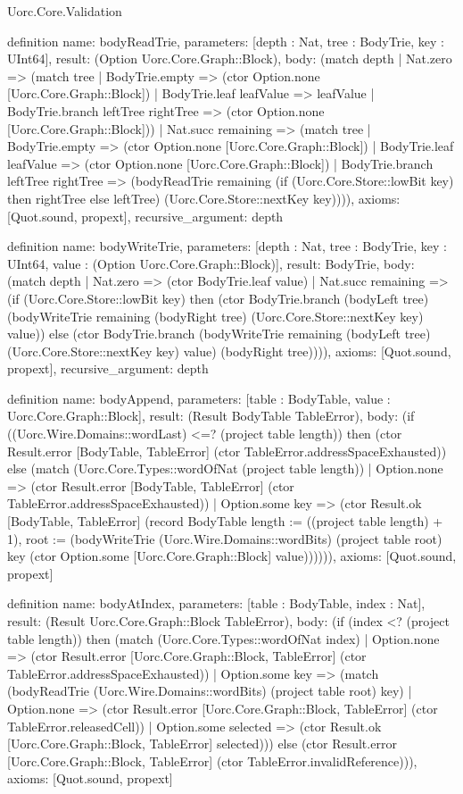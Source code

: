 \begin{lexlean}{Uorc.Core.Validation}
\begin{semanticmodule}
definition{
  name: bodyReadTrie,
  parameters: [depth : Nat, tree : BodyTrie, key : UInt64],
  result: (Option Uorc.Core.Graph::Block),
  body: (match depth
    | Nat.zero => (match tree
      | BodyTrie.empty => (ctor Option.none [Uorc.Core.Graph::Block])
      | BodyTrie.leaf leafValue => leafValue
      | BodyTrie.branch leftTree rightTree => (ctor Option.none [Uorc.Core.Graph::Block]))
    | Nat.succ remaining => (match tree
      | BodyTrie.empty => (ctor Option.none [Uorc.Core.Graph::Block])
      | BodyTrie.leaf leafValue => (ctor Option.none [Uorc.Core.Graph::Block])
      | BodyTrie.branch leftTree rightTree => (bodyReadTrie remaining (if (Uorc.Core.Store::lowBit key) then rightTree else leftTree) (Uorc.Core.Store::nextKey key)))),
  axioms: [Quot.sound, propext],
  recursive_argument: depth
}

definition{
  name: bodyWriteTrie,
  parameters: [depth : Nat, tree : BodyTrie, key : UInt64, value : (Option Uorc.Core.Graph::Block)],
  result: BodyTrie,
  body: (match depth
    | Nat.zero => (ctor BodyTrie.leaf value)
    | Nat.succ remaining => (if (Uorc.Core.Store::lowBit key) then (ctor BodyTrie.branch (bodyLeft tree) (bodyWriteTrie remaining (bodyRight tree) (Uorc.Core.Store::nextKey key) value)) else (ctor BodyTrie.branch (bodyWriteTrie remaining (bodyLeft tree) (Uorc.Core.Store::nextKey key) value) (bodyRight tree)))),
  axioms: [Quot.sound, propext],
  recursive_argument: depth
}

definition{
  name: bodyAppend,
  parameters: [table : BodyTable, value : Uorc.Core.Graph::Block],
  result: (Result BodyTable TableError),
  body: (if ((Uorc.Wire.Domains::wordLast) <=? (project table length)) then (ctor Result.error [BodyTable, TableError] (ctor TableError.addressSpaceExhausted)) else (match (Uorc.Core.Types::wordOfNat (project table length))
    | Option.none => (ctor Result.error [BodyTable, TableError] (ctor TableError.addressSpaceExhausted))
    | Option.some key => (ctor Result.ok [BodyTable, TableError] (record BodyTable {length := ((project table length) + 1), root := (bodyWriteTrie (Uorc.Wire.Domains::wordBits) (project table root) key (ctor Option.some [Uorc.Core.Graph::Block] value))})))),
  axioms: [Quot.sound, propext]
}

definition{
  name: bodyAtIndex,
  parameters: [table : BodyTable, index : Nat],
  result: (Result Uorc.Core.Graph::Block TableError),
  body: (if (index <? (project table length)) then (match (Uorc.Core.Types::wordOfNat index)
    | Option.none => (ctor Result.error [Uorc.Core.Graph::Block, TableError] (ctor TableError.addressSpaceExhausted))
    | Option.some key => (match (bodyReadTrie (Uorc.Wire.Domains::wordBits) (project table root) key)
      | Option.none => (ctor Result.error [Uorc.Core.Graph::Block, TableError] (ctor TableError.releasedCell))
      | Option.some selected => (ctor Result.ok [Uorc.Core.Graph::Block, TableError] selected))) else (ctor Result.error [Uorc.Core.Graph::Block, TableError] (ctor TableError.invalidReference))),
  axioms: [Quot.sound, propext]
}


\end{semanticmodule}
\end{lexlean}
